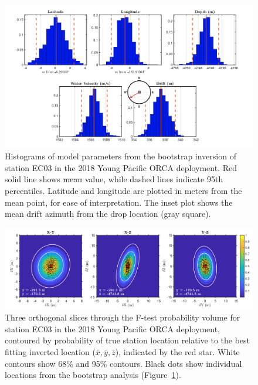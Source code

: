 \documentclass[10pt,titlepage]{article}
\providecommand{\DIFaddtex}[1]{{\protect\color{blue}\uwave{#1}}} %
\providecommand{\DIFdeltex}[1]{{\protect\color{red}\sout{#1}}}                      %
\providecommand{\DIFaddFL}[1]{\DIFadd{#1}} %
\providecommand{\DIFdelFL}[1]{\DIFdel{#1}} %
\providecommand{\DIFaddbeginFL}{} %
\providecommand{\DIFaddendFL}{} %
\providecommand{\DIFdelbeginFL}{} %
\providecommand{\DIFdelendFL}{} %
\providecommand{\DIFadd}[1]{\texorpdfstring{\DIFaddtex{#1}}{#1}} %
\providecommand{\DIFdel}[1]{\texorpdfstring{\DIFdeltex{#1}}{}} %
\begin{document}
\begin{figure}[h]
\includegraphics[trim=0cm 0cm 0cm 0cm,clip=true,width=\columnwidth]{Figure03.pdf}
\caption{Histograms of model parameters from the bootstrap inversion of station EC03 in the 2018 Young Pacific ORCA deployment. Red solid line shows \DIFdelbeginFL \DIFdelFL{mean }\DIFdelendFL \DIFaddbeginFL \DIFaddFL{median }\DIFaddendFL value, while dashed lines indicate 95th percentiles. Latitude and longitude are plotted in meters from the mean point, for ease of interpretation. The inset plot shows the mean drift azimuth from the drop location (gray square).}
\label{fig:one_sta_real_histograms}
\end{figure}

\newpage

\begin{figure}[h]
\includegraphics[trim=0cm 0cm 0cm 0cm,clip=true,width=\columnwidth]{Figure04.pdf}
\caption{ Three orthogonal slices through the F-test probability volume for station EC03 in the 2018 Young Pacific ORCA deployment, contoured by probability of true station location relative to the best fitting inverted location ($\bar{x},\bar{y},\bar{z}$), indicated by the red star. White contours show 68\% and 95\% contours. Black dots show individual locations from the bootstrap analysis (Figure~\ref{fig:one_sta_real_histograms}).}
\label{fig:one_sta_real_ftests}
\end{figure}
\end{document}
